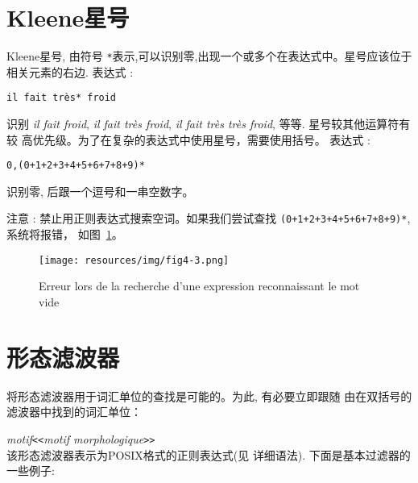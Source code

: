 \section{Kleene星号}
\index{\verb+*+}
Kleene星号, 由符号 \verb+*+表示,可以识别零,出现一个或多个在表达式中。星号应该位于相关元素的右边.
表达式 :


\begin{verbatim}
il fait très* froid
\end{verbatim}

\noindent 识别 \textit{il fait froid}, \textit{il fait très froid},
\textit{il fait très très froid}, 等等. 星号较其他运算符有较
高优先级。为了在复杂的表达式中使用星号，需要使用括号。 
表达式 :


\begin{verbatim}
0,(0+1+2+3+4+5+6+7+8+9)*
\end{verbatim}

\noindent 识别零, 后跟一个逗号和一串空数字。

\bigskip
\noindent 注意 : 禁止用正则表达式搜索空词。如果我们尝试查找 
\verb$(0+1+2+3+4+5+6+7+8+9)*$, 系统将报错，
如图~\ref{fig-epsilon-error}。


\bigskip
\begin{figure}[h]
\begin{center}
\texttt{[image: resources/img/fig4-3.png]}
\caption{Erreur lors de la recherche d’une expression reconnaissant le mot vide \label{fig-epsilon-error}}
\end{center}
\end{figure}


\section{形态滤波器}
\label{section-filters}

将形态滤波器用于词汇单位的查找是可能的。为此, 有必要立即跟随
由在双括号的滤波器中找到的词汇单位：


\bigskip
\noindent
\textit{motif}\verb$<<$\textit{motif morphologique}\verb$>>$ \\


\bigskip{}
\noindent 该形态滤波器表示为POSIX格式的正则表达式(见 \cite{TRE} 详细语法). 下面是基本过滤器的一些例子:




